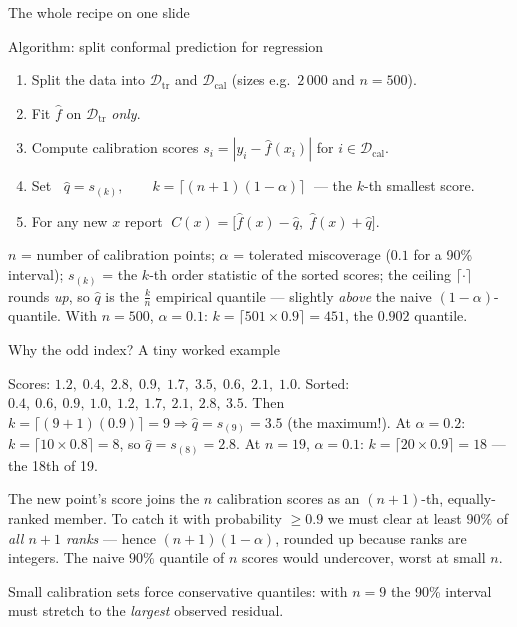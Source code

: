 \documentclass[aspectratio=169,11pt]{beamer}
\begin{document}
\begin{frame}{The whole recipe on one slide}
  \begin{block}{Algorithm: split conformal prediction for regression}
    \begin{enumerate}
      \item Split the data into $\mathcal{D}_{\text{tr}}$ and
            $\mathcal{D}_{\text{cal}}$ (sizes e.g.\ $2\,000$ and $n = 500$).
      \item Fit $\hat f$ on $\mathcal{D}_{\text{tr}}$ \emph{only}.
      \item Compute calibration scores $s_i = |y_i - \hat f(x_i)|$ for
            $i \in \mathcal{D}_{\text{cal}}$.
      \item Set
            $\;\boxed{\;\hat q = s_{(k)}, \qquad k = \big\lceil (n+1)(1-\alpha) \big\rceil\;}$
            \; --- the $k$-th smallest score.
      \item For any new $x$ report
            $\;C(x) = \big[\hat f(x) - \hat q,\; \hat f(x) + \hat q\big]$.
    \end{enumerate}
  \end{block}
  \begin{readme}
    $n$ = number of calibration points; $\alpha$ = tolerated miscoverage
    ($0.1$ for a 90\% interval); $s_{(k)}$ = the $k$-th order statistic of the sorted
    scores; the ceiling $\lceil \cdot \rceil$ rounds \emph{up}, so $\hat q$ is the
    $\tfrac{k}{n}$ empirical quantile --- slightly \emph{above} the naive
    $(1-\alpha)$-quantile. With $n = 500$, $\alpha = 0.1$:
    $k = \lceil 501 \times 0.9 \rceil = 451$, the $0.902$ quantile.
  \end{readme}
\end{frame}

\begin{frame}{Why the odd index? A tiny worked example}
  \footnotesize
  \begin{numexample}
    Scores: $1.2,\; 0.4,\; 2.8,\; 0.9,\; 1.7,\; 3.5,\; 0.6,\; 2.1,\; 1.0$.
    Sorted: $0.4,\ 0.6,\ 0.9,\ 1.0,\ 1.2,\ 1.7,\ 2.1,\ 2.8,\ 3.5$. Then
    $k = \lceil (9+1)(0.9) \rceil = 9 \Longrightarrow \hat q = s_{(9)} = 3.5$
    (the maximum!). At $\alpha = 0.2$: $k = \lceil 10 \times 0.8 \rceil = 8$, so
    $\hat q = s_{(8)} = 2.8$. At $n = 19$, $\alpha = 0.1$:
    $k = \lceil 20 \times 0.9 \rceil = 18$ --- the 18th of 19.
  \end{numexample}
  \begin{readme}
    The new point's score joins the $n$ calibration scores as an $(n{+}1)$-th,
    equally-ranked member. To catch it with probability $\ge 0.9$ we must clear at
    least $90\%$ of \emph{all $n+1$ ranks} --- hence $(n+1)(1-\alpha)$, rounded up
    because ranks are integers. The naive $90\%$ quantile of $n$ scores would
    undercover, worst at small $n$.
  \end{readme}
  \begin{takeaway}
    Small calibration sets force conservative quantiles: with $n = 9$ the 90\%
    interval must stretch to the \emph{largest} observed residual.
  \end{takeaway}
\end{frame}
\end{document}

